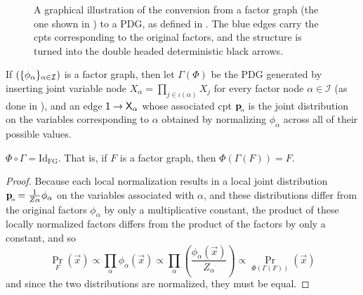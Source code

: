 \documentclass{article}
\newcommand{\bp}[1][L]{\mat{p}_{\!_{#1}\!}}
\numberwithin{equation}{section}
\begin{document}
\begin{figure}[htb]
{}
		
		\caption{A graphical illustration of the conversion from a factor graph (the one shown in ) to a PDG, as defined in . The blue edges carry the cpts corresponding to the original factors, and the structure is turned into the double headed deterministic black arrows.}
		\label{fig:fg2PDG}
	\end{figure}
	
	\begin{defn} \label{def:fg2PDG}
		If $(\{\phi_\alpha\}_{\alpha \in \cal I})$ is a factor graph, then let $\Gamma(\Phi)$ be the PDG generated by inserting joint variable node $X_\alpha = \prod_{j \in \iota(\alpha)} X_j$ for every factor node $\alpha \in \mathcal I$ (as done in ), and an edge $\sf 1 \to X_\alpha$ whose associated cpt $\bp[\alpha]$ is the joint distribution on the variables corresponding to $\alpha$ obtained by normalizing $\phi_\alpha$ across all of their possible values.%
	\end{defn}

	\begin{prop}\label{prop:fg-pdg-lossless}
		$\Phi \circ \Gamma = \mathrm{Id}_{\text{FG}}$. That is, if $F$ is a factor graph, then $\Phi(\Gamma(F)) = F$.
	\end{prop}
	\begin{proof}
		Because each local normalization results in a local joint
                distribution $\bp[\alpha] = \frac{1}{Z\alpha}
                \phi_\alpha$ on the variables associated with $\alpha$, and these distributions differ from the original factors $\phi_\alpha$ by only a multiplicative 
               constant, the product of these locally normalized factors differs from the product of the factors by only a constant, and so 
		\[ \Pr_F(\vec x) \propto \prod_\alpha \phi_\alpha(\vec x) \propto \prod_\alpha \left(\frac{\phi_\alpha(\vec x)}{Z_\alpha}\right) \propto \Pr_{\Phi(\Gamma(F))}(\vec x) \]
		and since the two distributions are normalized, they must be equal.
	\end{proof}
	
\end{document}
